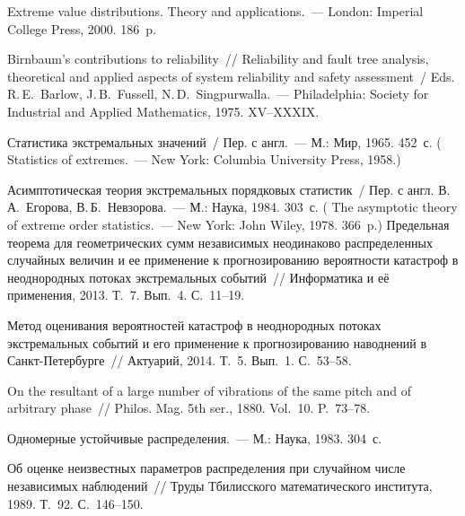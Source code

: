 \begin{multicols}{2}
{{\begin{thebibliography}{99}
 Extreme value distributions. Theory
and applications.~--- London: Imperial College Press, 2000. 186~p.

 Birnbaum's contributions
to reliability~//
Reliability and fault tree analysis, theoretical and applied aspects
of system reliability and safety assessment~/ Eds. R.\,E.~Barlow,
J.\,B.~Fussell, N.\,D.~Singpurwalla.~--- Philadelphia: Society for
Industrial and Applied Mathematics, 1975. XV--XXXIX.

  
Статистика экстремальных значений~/ Пер. с англ.~--- М.: Мир, 1965.
452~с. ( Statistics of extremes.~--- New York: Columbia
University Press, 1958.)

  Асимптотическая теория
экстремальных порядковых статистик~/
Пер. с англ. В.\,А.~Егорова, В.\,Б.~Невзорова.~--- М.: Наука, 1984.
303~с. ( The asymptotic
theory of extreme order statistics.~--- New York: John Wiley, 1978. 366~p.)
\linebreak
Предельная теорема для геометрических сумм независимых
неодинаково распределенных случайных величин и ее
применение к прогнозированию ве\-ро\-ят\-ности катастроф в неоднородных
потоках экстремальных событий~// Информатика и её применения, 2013.
Т.~7. Вып.~4. С.~11--19.

  Метод оценивания вероятностей катастроф в неоднородных
потоках экстремальных событий и его применение к прогнозированию
наводнений в Санкт-Пе\-тер\-бур\-ге~// Актуарий, 2014. Т.~5. Вып.~1. С.~53--58.

  On the resultant of
a large number of vibrations of the same pitch and of arbitrary
phase~// Philos. Mag. 5th ser., 1880. Vol.~10. P.~73--78.

 Одномерные устойчивые
распределения.~--- М.: Наука, 1983. 304~с.



 Об оценке неизвестных параметров
распределения при случайном числе независимых наблюдений~// Труды
Тбилисского математического института, 1989. Т.~92. С.~146--150.


\end{thebibliography}}}
\end{multicols}
